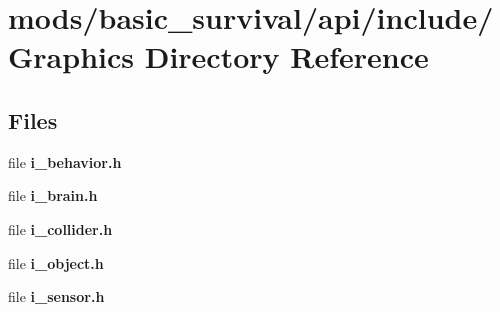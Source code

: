 \section{mods/basic\+\_\+survival/api/include/\+Graphics Directory Reference}
\label{dir_2a97b22d9994177a027bcf7365ef3351}
\subsection*{Files}
\begin{DoxyCompactItemize}
\item 
file {\bfseries i\+\_\+behavior.\+h}
\item 
file {\bfseries i\+\_\+brain.\+h}
\item 
file {\bfseries i\+\_\+collider.\+h}
\item 
file {\bfseries i\+\_\+object.\+h}
\item 
file {\bfseries i\+\_\+sensor.\+h}
\end{DoxyCompactItemize}
